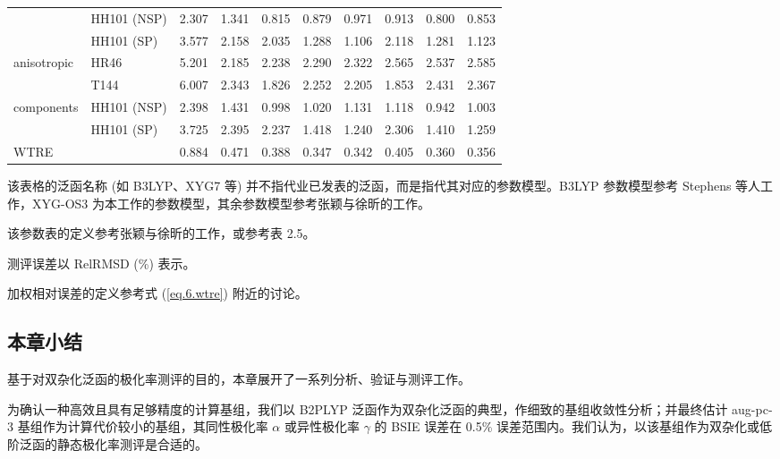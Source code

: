 \begin{landscape}
\begin{table}[htp]
\begin{tabular}{lld{3.7}d{3.7}d{3.7}d{3.7}d{3.7}d{3.7}d{3.7}d{3.7}}
                & HH101 (NSP) & 2.307      & 1.341      & 0.815      & 0.879      & 0.971     & 0.913    & 0.800      & 0.853      \\
                & HH101 (SP)  & 3.577      & 2.158      & 2.035      & 1.288      & 1.106     & 2.118    & 1.281      & 1.123      \\ \hdashline
    anisotropic
                & HR46        & 5.201      & 2.185      & 2.238      & 2.290      & 2.322     & 2.565    & 2.537      & 2.585      \\
                & T144        & 6.007      & 2.343      & 1.826      & 2.252      & 2.205     & 1.853    & 2.431      & 2.367      \\ \hdashline
    components
                & HH101 (NSP) & 2.398      & 1.431      & 0.998      & 1.020      & 1.131     & 1.118    & 0.942      & 1.003      \\
                & HH101 (SP)  & 3.725      & 2.395      & 2.237      & 1.418      & 1.240     & 2.306    & 1.410      & 1.259      \\ \hdashline
    WTRE
                &             & 0.884      & 0.471      & 0.388      & 0.347      & 0.342     & 0.405    & 0.360      & 0.356      \\ \hline
    \end{tabular}

    \raggedright
    \par{} 该表格的泛函名称 (如 B3LYP、XYG7 等) 并不指代业已发表的泛函，而是指代其对应的参数模型。B3LYP 参数模型参考 Stephens 等人工作\cite{Stephens-Frisch.JPC.1994}，XYG-OS3 为本工作的参数模型，其余参数模型参考张颖与徐昕的工作\cite{Zhang-Xu.JPCL.2021}。
    \par{} 该参数表的定义参考张颖与徐昕的工作\cite{Zhang-Xu.JPCL.2021}，或参考\alert{表 2.5}。
    \par{} 测评误差以 RelRMSD (\%) 表示。
    \par{} 加权相对误差的定义参考式 (\ref{eq.6.wtre}) 附近的讨论。
\end{table}
\end{landscape}

\subsection{本章小结}

基于对双杂化泛函的极化率测评的目的，本章展开了一系列分析、验证与测评工作。

为确认一种高效且具有足够精度的计算基组，我们以 B2PLYP 泛函作为双杂化泛函的典型，作细致的基组收敛性分析；并最终估计 aug-pc-3 基组作为计算代价较小的基组，其同性极化率 $\alpha$ 或异性极化率 $\gamma$ 的 BSIE 误差在 0.5\% 误差范围内。我们认为，以该基组作为双杂化或低阶泛函的静态极化率测评是合适的。

